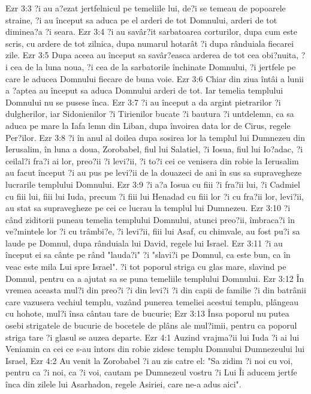 Ezr 3:3  ?i au a?ezat jertfelnicul pe temeliile lui, de?i se temeau de popoarele straine, ?i au început sa aduca pe el arderi de tot Domnului, arderi de tot diminea?a ?i seara.
Ezr 3:4  ?i au savâr?it sarbatoarea corturilor, dupa cum este scris, cu ardere de tot zilnica, dupa numarul hotarât ?i dupa rânduiala fiecarei zile.
Ezr 3:5  Dupa aceea au început sa savâr?easca arderea de tot cea obi?nuita, ?i cea de la luna noua, ?i cea de la sarbatorile închinate Domnului, ?i jertfele pe care le aducea Domnului fiecare de buna voie.
Ezr 3:6  Chiar din ziua întâi a lunii a ?aptea au început sa aduca Domnului arderi de tot. Iar temelia templului Domnului nu se pusese înca.
Ezr 3:7  ?i au început a da argint pietrarilor ?i dulgherilor, iar Sidonienilor ?i Tirienilor bucate ?i bautura ?i untdelemn, ca sa aduca pe mare la Iafa lemn din Liban, dupa învoirea data lor de Cirus, regele Per?ilor.
Ezr 3:8  ?i în anul al doilea dupa sosirea lor la templul lui Dumnezeu din Ierusalim, în luna a doua, Zorobabel, fiul lui Salatiel, ?i Iosua, fiul lui Io?adac, ?i ceilal?i fra?i ai lor, preo?ii ?i levi?ii, ?i to?i cei ce venisera din robie la Ierusalim au facut început ?i au pus pe levi?ii de la douazeci de ani în sus sa supravegheze lucrarile templului Domnului.
Ezr 3:9  ?i a?a Iosua cu fiii ?i fra?ii lui, ?i Cadmiel cu fiii lui, fiii lui Iuda, precum ?i fiii lui Henadad cu fiii lor ?i cu fra?ii lor, levi?ii, au stat sa supravegheze pe cei ce lucrau la templul lui Dumnezeu.
Ezr 3:10  ?i când ziditorii puneau temelia templului Domnului, atunci preo?ii, îmbraca?i în ve?mintele lor ?i cu trâmbi?e, ?i levi?ii, fiii lui Asaf, cu chimvale, au fost pu?i sa laude pe Domnul, dupa rânduiala lui David, regele lui Israel.
Ezr 3:11  ?i au început ei sa cânte pe rând "lauda?i" ?i "slavi?i pe Domnul, ca este bun, ca în veac este mila Lui spre Israel". ?i tot poporul striga cu glas mare, slavind pe Domnul, pentru ca a ajutat sa se puna temeliile templului Domnului.
Ezr 3:12  În vremea aceasta mul?i din preo?i ?i din levi?i ?i din capii de familie ?i din batrânii care vazusera vechiul templu, vazând punerea temeliei acestui templu, plângeau cu hohote, mul?i însa cântau tare de bucurie;
Ezr 3:13  Însa poporul nu putea osebi strigatele de bucurie de bocetele de plâns ale mul?imii, pentru ca poporul striga tare ?i glasul se auzea departe.
Ezr 4:1  Auzind vrajma?ii lui Iuda ?i ai lui Veniamin ca cei ce s-au întors din robie zidesc templu Domnului Dumnezeului lui Israel,
Ezr 4:2  Au venit la Zorobabel ?i au zis catre el: "Sa zidim ?i noi cu voi, pentru ca ?i noi, ca ?i voi, cautam pe Dumnezeul vostru ?i Lui Îi aducem jertfe înca din zilele lui Asarhadon, regele Asiriei, care ne-a adus aici".
